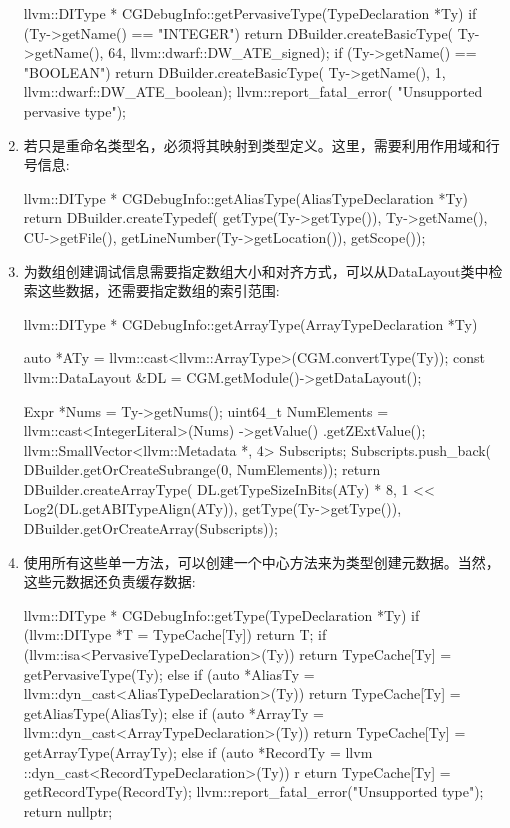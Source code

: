 \begin{enumerate}
\begin{cpp}
llvm::DIType *
CGDebugInfo::getPervasiveType(TypeDeclaration *Ty) {
    if (Ty->getName() == "INTEGER") {
        return DBuilder.createBasicType(
            Ty->getName(), 64, llvm::dwarf::DW_ATE_signed);
    }
    if (Ty->getName() == "BOOLEAN") {
        return DBuilder.createBasicType(
            Ty->getName(), 1, llvm::dwarf::DW_ATE_boolean);
    }
    llvm::report_fatal_error(
        "Unsupported pervasive type");
}
\end{cpp}

\item
若只是重命名类型名，必须将其映射到类型定义。这里，需要利用作用域和行号信息:

\begin{cpp}
llvm::DIType *
CGDebugInfo::getAliasType(AliasTypeDeclaration *Ty) {
    return DBuilder.createTypedef(
        getType(Ty->getType()), Ty->getName(),
        CU->getFile(), getLineNumber(Ty->getLocation()),
        getScope());
}
\end{cpp}

\item
为数组创建调试信息需要指定数组大小和对齐方式，可以从DataLayout类中检索这些数据，还需要指定数组的索引范围:

\begin{cpp}
llvm::DIType *
CGDebugInfo::getArrayType(ArrayTypeDeclaration *Ty) {
    auto *ATy =
        llvm::cast<llvm::ArrayType>(CGM.convertType(Ty));
    const llvm::DataLayout &DL =
        CGM.getModule()->getDataLayout();

    Expr *Nums = Ty->getNums();
    uint64_t NumElements =
        llvm::cast<IntegerLiteral>(Nums)
            ->getValue()
            .getZExtValue();
    llvm::SmallVector<llvm::Metadata *, 4> Subscripts;
    Subscripts.push_back(
        DBuilder.getOrCreateSubrange(0, NumElements));
    return DBuilder.createArrayType(
        DL.getTypeSizeInBits(ATy) * 8,
        1 << Log2(DL.getABITypeAlign(ATy)),
        getType(Ty->getType()),
        DBuilder.getOrCreateArray(Subscripts));
}
\end{cpp}

\item
使用所有这些单一方法，可以创建一个中心方法来为类型创建元数据。当然，这些元数据还负责缓存数据:

\begin{cpp}
llvm::DIType *
CGDebugInfo::getType(TypeDeclaration *Ty) {
    if (llvm::DIType *T = TypeCache[Ty])
        return T;
    if (llvm::isa<PervasiveTypeDeclaration>(Ty))
        return TypeCache[Ty] = getPervasiveType(Ty);
    else if (auto *AliasTy =
        llvm::dyn_cast<AliasTypeDeclaration>(Ty))
            return TypeCache[Ty] = getAliasType(AliasTy);
    else if (auto *ArrayTy =
        llvm::dyn_cast<ArrayTypeDeclaration>(Ty))
            return TypeCache[Ty] = getArrayType(ArrayTy);
    else if (auto *RecordTy =
        llvm ::dyn_cast<RecordTypeDeclaration>(Ty))
        r   eturn TypeCache[Ty] = getRecordType(RecordTy);
    llvm::report_fatal_error("Unsupported type");
    return nullptr;
}
\end{cpp}


\end{enumerate}
